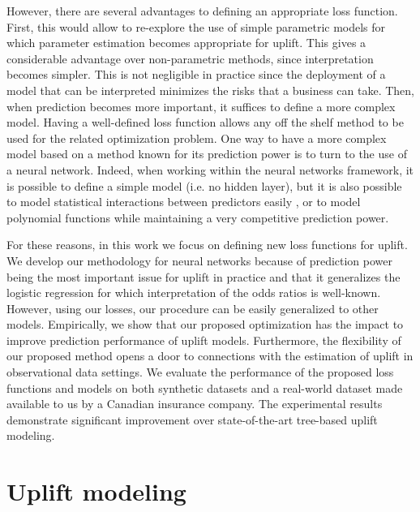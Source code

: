 \documentclass{article}
\begin{document}
However, there are several advantages to defining an appropriate loss function. First, this would allow to re-explore the use of simple parametric models for which parameter estimation becomes appropriate for uplift. This gives a considerable advantage over non-parametric methods, since interpretation becomes simpler. This is not negligible in practice since the deployment of a model that can be interpreted minimizes the risks that a business can take. Then, when prediction becomes more important, it suffices to define a more complex model. Having a well-defined loss function allows any off the shelf method to be used for the related optimization problem. One way to have a more complex model based on a method known for its prediction power is to turn to the use of a neural network. Indeed, when working within the neural networks framework, it is possible to define a simple model (i.e. no hidden layer), but it is also possible to model statistical interactions between predictors easily \citep{tsang2018neural}, or to model polynomial functions \citep{andoni2014learning} while maintaining a very competitive prediction power.


For these reasons, in this work we focus on defining new loss functions for uplift. We develop our methodology for neural networks because of prediction power being the most important issue for uplift in practice and that it generalizes the logistic regression for which interpretation of the odds ratios is well-known. However, using our losses, our procedure can be easily generalized to other models. Empirically, we show that our proposed optimization has the impact to improve prediction performance of uplift models. Furthermore, the flexibility of our proposed method opens a door to connections with the estimation of uplift in observational data settings. We evaluate the performance of the proposed loss functions and models on both synthetic datasets and a real-world dataset made available to us by a Canadian insurance company. The experimental results demonstrate significant improvement over state-of-the-art tree-based uplift modeling.


\section{Uplift modeling}
\label{sec:literature}
\end{document}
